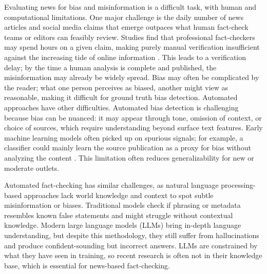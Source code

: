 \documentclass{scrartcl}
\begin{document}
Evaluating news for bias and misinformation is a difficult task, with human and computational limitations. One major challenge is the daily number of news articles and social media claims that emerge outpaces what human fact-check teams or editors can feasibly review. Studies find that professional fact-checkers may spend hours on a given claim, making purely manual verification insufficient against the increasing tide of online information \cite{r12}. This leads to a verification delay; by the time a human analysis is complete and published, the misinformation may already be widely spread. Bias may often be complicated by the reader; what one person perceives as biased, another might view as reasonable, making it difficult for ground truth bias detection.
Automated approaches have other difficulties. Automated bias detection is challenging because bias can be nuanced: it may appear through tone, omission of context, or choice of sources, which require understanding beyond surface text features. Early machine learning models often picked up on spurious signals; for example, a classifier could mainly learn the source publication as a proxy for bias without analyzing the content \cite{r13}. This limitation often reduces generalizability for new or moderate outlets.


Automated fact-checking has similar challenges, as natural language processing-based approaches lack world knowledge and context to spot subtle misinformation or biases. Traditional models check if phrasing or metadata resembles known false statements and might struggle without contextual knowledge. Modern large language models (LLMs) bring in-depth language understanding, but despite this methodology, they still suffer from hallucinations and produce confident-sounding but incorrect answers\cite{r14}. LLMs are constrained by what they have seen in training, so recent research is often not in their knowledge base, which is essential for news-based fact-checking.
 
\end{document}

